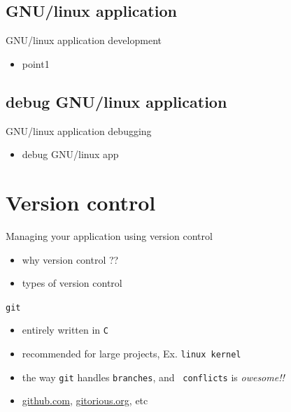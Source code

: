 \documentclass{beamer}
\begin{document}
\subsection{GNU/linux application}
\begin{frame}{GNU/linux application development}
  \begin{block}{}
    \begin{itemize}
    \item point1 
    \end{itemize}
  \end{block}
\end{frame}

\subsection{debug GNU/linux application}
\begin{frame}{GNU/linux application debugging}
  \begin{block}{}
    \begin{itemize}
    \item debug GNU/linux app
    \end{itemize}
  \end{block}
\end{frame}

\section{Version control}
\begin{frame}{Managing your application using version control}
  \begin{itemize}
  \item why version control ??
  \item types of version control 
  \end{itemize}

  \begin{block}{{\tt git}}
    \begin{itemize}
    \item entirely written in {\tt C}
    \item recommended for large projects, Ex. {\tt linux kernel}
    \item the way {\tt git} handles {\tt branches}, and {\tt
      conflicts} is {\em owesome!!}
    \item {\url{github.com}}, {\url{gitorious.org}}, etc
    \end{itemize}
  \end{block}
\end{frame}
\end{document}
